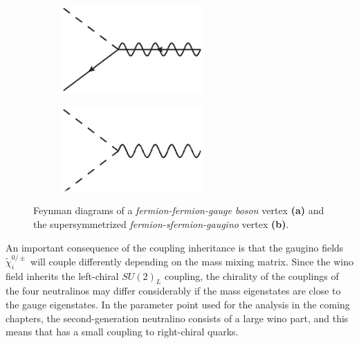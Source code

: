 \documentclass[twoside,english]{uiofysmaster}
\begin{document}
\begin{figure}[htbp]
	\begin{subfigure}[b]{0.45\textwidth}
		\centering
		\includegraphics[width=0.6\textwidth]{figures/susyintro/sfg_vertex.eps}
		\caption{ }
		\label{fig:feynmandiagram_supersymmetrization_b}
	\end{subfigure}
	\begin{subfigure}[b]{0.45\textwidth}
		\centering
		\includegraphics[width=0.6\textwidth]{figures/susyintro/ssg_vertex.eps}
		\caption{ }
		\label{fig:feynmandiagram_supersymmetrization_c}
	\end{subfigure}
	\caption{Feynman diagrams of a {\it fermion-fermion-gauge boson} vertex {\bf (a)} and the supersymmetrized {\it fermion-sfermion-gaugino} vertex {\bf (b)}.}
	\label{fig:feynmandiagram_supersymmetrization}
\end{figure}

An important consequence of the coupling inheritance is that the gaugino fields $\tilde\chi_i^{0/\pm}$ will couple differently depending on the mass mixing matrix. Since the wino field inherits the left-chiral $SU(2)_L$ coupling, the chirality of the couplings of the four neutralinos may differ considerably if the mass eigenstates are close to the gauge eigenstates. In the parameter point used for the analysis in the coming chapters, the second-generation neutralino consists of a large wino part, and this means that has a small coupling to right-chiral quarks. 
\end{document}

